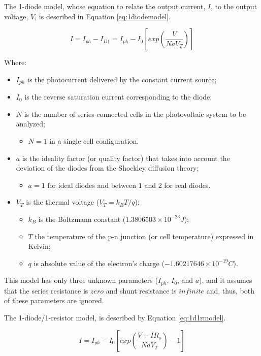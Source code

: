 The 1-diode model, whose equation to relate the output current, $I$, to the output voltage, $V$, is described in Equation \ref{eq:1diodemodel}. 

\begin{equation}
\label{eq:1diodemodel}
I = I_{ph}-I_{D1}=I_{ph}-I_{0}\left[ exp \left( \dfrac{V}{NaV_{T}} \right)  \right] 
\end{equation}

Where:
\begin{itemize}
\item $I_{ph}$ is the photocurrent delivered by the constant current source; 
\item $ I_{0} $ is the reverse saturation current corresponding to the diode; 
\item $ N $ is the number of series-connected cells in the photovoltaic system to be analyzed;
	\begin{itemize}
	\item $ N=1 $ in a single cell configuration. 	
	\end{itemize}	  
\item $ a $ is the ideality factor (or quality factor) that takes into account the deviation of the diodes from the Shockley diffusion theory; 
	\begin{itemize}
	\item $a=1$ for ideal diodes and between $ 1 $ and $ 2 $ for real diodes. 	
	\end{itemize}
\item $V_{T}$ is the thermal voltage ($ V_{T}=k_{B}T/q $);
	\begin{itemize}
	\item $ k_{B} $ is the Boltzmann constant ($ 1.3806503\times10^{-23}J $); 
	\item $ T $ the temperature of the p-n junction (or cell temperature) expressed in Kelvin; 
	\item $ q $ is absolute value of the electron's charge ($ -1.60217646\times10^{-19}C $).	
	\end{itemize}	 
\end{itemize}


This model has only three unknown parameters ($ I_{ph}$, $I_{0}$, and $a $), and it assumes that the series resistance is $ zero $ and shunt resistance is $ infinite $ and, thus, both of these parameters are ignored.
 
The 1-diode/1-resistor model, is described by Equation \ref{eq:1d1rmodel}. 

\begin{equation}
\label{eq:1d1rmodel}
I =I_{ph}-I_{0}\left[ exp \left( \dfrac{V+IR_{s}}{NaV_{T}} \right) -1 \right] 
\end{equation}

